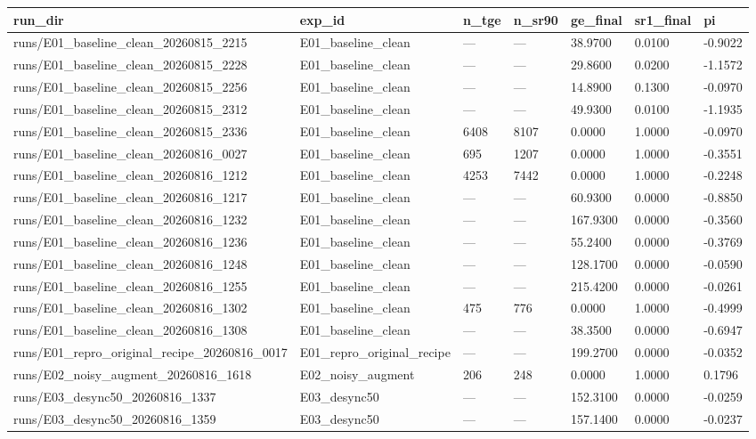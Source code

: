 \begin{tabular}{lllllll}
\toprule
run_dir & exp_id & n_tge & n_sr90 & ge_final & sr1_final & pi \\
\midrule
runs/E01_baseline_clean_20260815_2215 & E01_baseline_clean & — & — & 38.9700 & 0.0100 & -0.9022 \\
runs/E01_baseline_clean_20260815_2228 & E01_baseline_clean & — & — & 29.8600 & 0.0200 & -1.1572 \\
runs/E01_baseline_clean_20260815_2256 & E01_baseline_clean & — & — & 14.8900 & 0.1300 & -0.0970 \\
runs/E01_baseline_clean_20260815_2312 & E01_baseline_clean & — & — & 49.9300 & 0.0100 & -1.1935 \\
runs/E01_baseline_clean_20260815_2336 & E01_baseline_clean & 6408 & 8107 & 0.0000 & 1.0000 & -0.0970 \\
runs/E01_baseline_clean_20260816_0027 & E01_baseline_clean & 695 & 1207 & 0.0000 & 1.0000 & -0.3551 \\
runs/E01_baseline_clean_20260816_1212 & E01_baseline_clean & 4253 & 7442 & 0.0000 & 1.0000 & -0.2248 \\
runs/E01_baseline_clean_20260816_1217 & E01_baseline_clean & — & — & 60.9300 & 0.0000 & -0.8850 \\
runs/E01_baseline_clean_20260816_1232 & E01_baseline_clean & — & — & 167.9300 & 0.0000 & -0.3560 \\
runs/E01_baseline_clean_20260816_1236 & E01_baseline_clean & — & — & 55.2400 & 0.0000 & -0.3769 \\
runs/E01_baseline_clean_20260816_1248 & E01_baseline_clean & — & — & 128.1700 & 0.0000 & -0.0590 \\
runs/E01_baseline_clean_20260816_1255 & E01_baseline_clean & — & — & 215.4200 & 0.0000 & -0.0261 \\
runs/E01_baseline_clean_20260816_1302 & E01_baseline_clean & 475 & 776 & 0.0000 & 1.0000 & -0.4999 \\
runs/E01_baseline_clean_20260816_1308 & E01_baseline_clean & — & — & 38.3500 & 0.0000 & -0.6947 \\
runs/E01_repro_original_recipe_20260816_0017 & E01_repro_original_recipe & — & — & 199.2700 & 0.0000 & -0.0352 \\
runs/E02_noisy_augment_20260816_1618 & E02_noisy_augment & 206 & 248 & 0.0000 & 1.0000 & 0.1796 \\
runs/E03_desync50_20260816_1337 & E03_desync50 & — & — & 152.3100 & 0.0000 & -0.0259 \\
runs/E03_desync50_20260816_1359 & E03_desync50 & — & — & 157.1400 & 0.0000 & -0.0237 \\

\end{tabular}
